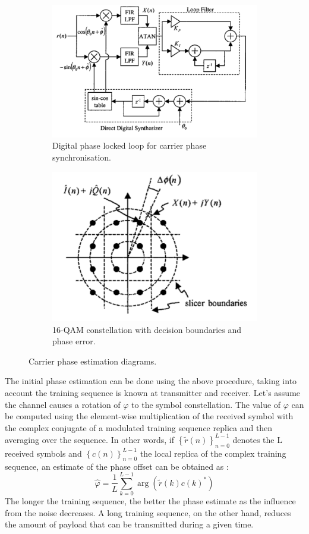 \documentclass[12pt,a4paper,openright]{article}
\begin{document}
 \begin{figure}[h]
 \centering
\begin{subfigure}{0.5\textwidth}
 \centering
    \includegraphics[width=0.9\linewidth]{DPLL.pdf}
    \caption{Digital phase locked loop for carrier phase synchronisation.}
    \label{fig:DPLL}
\end{subfigure}%
\begin{subfigure}{0.5\textwidth}
 \centering
    \includegraphics[width=0.7\linewidth]{PD.pdf}
    \caption{16-QAM constellation with decision boundaries and phase error.}
    \label{fig:PD1}
    \end{subfigure}
    \caption{Carrier phase estimation diagrams\protect\label{CarrierSynchPaper}.}
    \label{fig:carrierphase}
\end{figure}



The initial phase estimation can be done using the above procedure, taking into account the training sequence is known at transmitter and receiver. Let's assume the channel causes a rotation of $\varphi$ to the symbol constellation. The value of $\varphi$ can be computed using the element-wise multiplication of the received symbol with the complex conjugate of a modulated training sequence replica and then averaging over the sequence. In other words, if ${\left\{ {\tilde r(n)} \right\}_{n = 0}^{L - 1}}$ denotes the L received symbols and ${\left\{ {c(n)} \right\}_{n = 0}^{L - 1}}$ the local replica of the complex training sequence, an estimate of the phase offset can be obtained as \cite{ProjectEQ2310}:
\[\hat \varphi  = \frac{1}{L}\sum\limits_{k=0}^{L - 1} {\arg (\tilde r(k)c(k)^*)} \]
The longer the training sequence, the better the phase estimate as the influence from the noise decreases. A long training sequence, on the other hand, reduces the amount of payload that can be transmitted during a given time.
\end{document}
